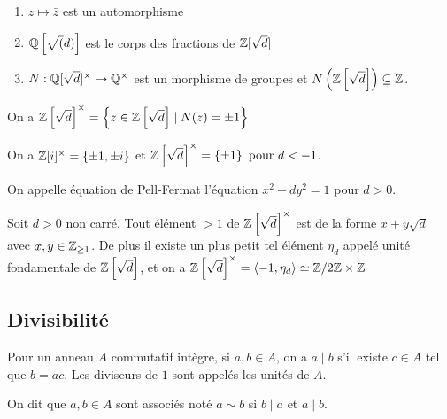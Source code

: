 \documentclass{cours}
\begin{document}
\begin{lemma}
    \begin{enumerate}
        \item $z \mapsto \bar{z}$ est un automorphisme
        \item $\mathbb{Q}\left[\sqrt(d)\right]$ est le corps des fractions de $\mathbb{Z}[\sqrt{d}]$
        \item $N : \mathbb{Q}[\sqrt{d}]^{\times} \mapsto \mathbb{Q}^{\times}$ est un morphisme de groupes et $N\left(\mathbb{Z}\left[\sqrt{d}\right]\right) \subseteq \mathbb{Z}$.
    \end{enumerate}
\end{lemma}

\begin{lemma}
    On a $ \mathbb{Z}\left[\sqrt{d}\right]^{\times} = \left\{z \in \mathbb{Z}\left[\sqrt{d}\right] \mid N(z) = \pm 1\right\}$
\end{lemma}

\begin{corollary}
    On a $\mathbb{Z}[i]^{\times} = \left\{\pm 1, \pm i\right\}$ et $\mathbb{Z}\left[\sqrt{d}\right]^{\times} = \left\{\pm 1\right\} \text{ pour } d < -1$.
\end{corollary}

\begin{remark}
    On appelle équation de Pell-Fermat l'équation $x^{2} - dy^{2} = 1$ pour $d > 0$.
\end{remark}

\begin{proposition}
    Soit $d > 0$ non carré. Tout élément $> 1$ de $\mathbb{Z}\left[\sqrt{d}\right]^{\times}$ est de la forme $x + y\sqrt{d}$ avec $x, y \in \mathbb{Z}_{\geq 1}$. De plus il existe un plus petit tel élément $\eta_{d}$ appelé unité fondamentale de $\mathbb{Z}\left[\sqrt{d}\right]$, et on a $\mathbb{Z}\left[\sqrt{d}\right]^{\times} = \left\langle -1, \eta_{d} \right\rangle \simeq \mathbb{Z}/2\mathbb{Z} \times \mathbb{Z}$
\end{proposition}

\subsection{Divisibilité}
\begin{definition}
    Pour un anneau $A$ commutatif intègre, si $a, b \in A$, on a $a\mid b$ s'il existe $c\in A$ tel que $b = ac$. Les diviseurs de $1$ sont appelés les unités de $A$. 
\end{definition}

\begin{definition}
    On dit que $a, b \in A$ sont associés noté $a \sim b$ si $b \mid a$ et $a \mid b$. 
\end{definition}
\end{document}
